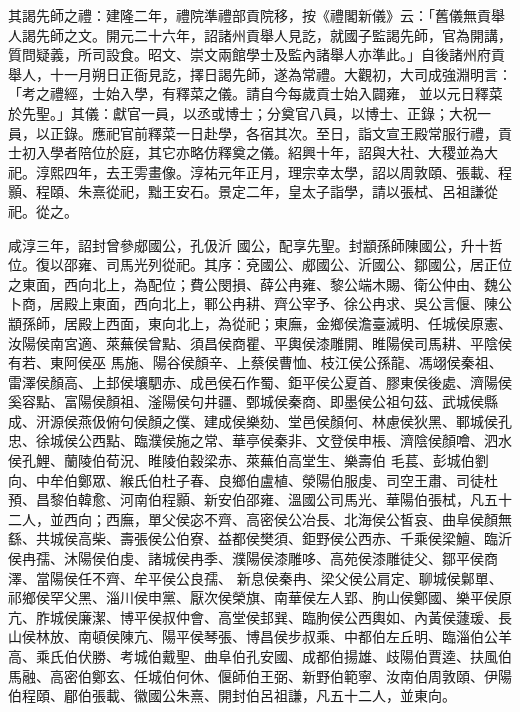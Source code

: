 \begin{pinyinscope}
 其謁先師之禮：建隆二年，禮院準禮部貢院移，按《禮閣新儀》云：「舊儀無貢舉人謁先師之文。開元二十六年，詔諸州貢舉人見訖，就國子監謁先師，官為開講，質問疑義，所司設食。昭文、崇文兩館學士及監內諸舉人亦準此。」自後諸州府貢舉人，十一月朔日正衙見訖，擇日謁先師，遂為常禮。大觀初，大司成強淵明言：「考之禮經，士始入學，有釋菜之儀。請自今每歲貢士始入闢雍，
 並以元日釋菜於先聖。」其儀：獻官一員，以丞或博士；分奠官八員，以博士、正錄；大祝一員，以正錄。應祀官前釋菜一日赴學，各宿其次。至日，詣文宣王殿常服行禮，貢士初入學者陪位於庭，其它亦略仿釋奠之儀。紹興十年，詔與大社、大稷並為大祀。淳熙四年，去王雱畫像。淳祐元年正月，理宗幸太學，詔以周敦頤、張載、程顥、程頤、朱熹從祀，黜王安石。景定二年，皇太子詣學，請以張栻、呂祖謙從祀。從之。



 咸淳三年，詔封曾參郕國公，孔伋沂
 國公，配享先聖。封顓孫師陳國公，升十哲位。復以邵雍、司馬光列從祀。其序：兗國公、郕國公、沂國公、鄒國公，居正位之東面，西向北上，為配位；費公閔損、薛公冉雍、黎公端木賜、衛公仲由、魏公卜商，居殿上東面，西向北上，鄆公冉耕、齊公宰予、徐公冉求、吳公言偃、陳公顓孫師，居殿上西面，東向北上，為從祀；東廡，金鄉侯澹臺滅明、任城侯原憲、汝陽侯南宮適、萊蕪侯曾點、須昌侯商瞿、平輿侯漆雕開、睢陽侯司馬耕、平陰侯有若、東阿侯巫
 馬施、陽谷侯顏辛、上蔡侯曹恤、枝江侯公孫龍、馮翊侯秦祖、雷澤侯顏高、上邽侯壤駟赤、成邑侯石作蜀、鉅平侯公夏首、膠東侯後處、濟陽侯奚容點、富陽侯顏祖、滏陽侯句井疆、鄄城侯秦商、即墨侯公祖句茲、武城侯縣成、汧源侯燕伋俯句侯顏之僕、建成侯樂劾、堂邑侯顏何、林慮侯狄黑、鄆城侯孔忠、徐城侯公西點、臨濮侯施之常、華亭侯秦非、文登侯申棖、濟陰侯顏噲、泗水侯孔鯉、蘭陵伯荀況、睢陵伯穀梁赤、萊蕪伯高堂生、樂壽伯
 毛萇、彭城伯劉向、中牟伯鄭眾、緱氏伯杜子春、良鄉伯盧植、滎陽伯服虔、司空王肅、司徒杜預、昌黎伯韓愈、河南伯程顥、新安伯邵雍、溫國公司馬光、華陽伯張栻，凡五十二人，並西向；西廡，單父侯宓不齊、高密侯公冶長、北海侯公皙哀、曲阜侯顏無繇、共城侯高柴、壽張侯公伯寮、益都侯樊須、鉅野侯公西赤、千乘侯梁鱣、臨沂侯冉孺、沐陽侯伯虔、諸城侯冉季、濮陽侯漆雕哆、高苑侯漆雕徒父、鄒平侯商澤、當陽侯任不齊、牟平侯公良孺、
 新息侯秦冉、梁父侯公肩定、聊城侯鄡單、祁鄉侯罕父黑、淄川侯申黨、厭次侯榮旗、南華侯左人郢、朐山侯鄭國、樂平侯原亢、胙城侯廉潔、博平侯叔仲會、高堂侯邽巽、臨朐侯公西輿如、內黃侯蘧瑗、長山侯林放、南頓侯陳亢、陽平侯琴張、博昌侯步叔乘、中都伯左丘明、臨淄伯公羊高、乘氏伯伏勝、考城伯戴聖、曲阜伯孔安國、成都伯揚雄、歧陽伯賈逵、扶風伯馬融、高密伯鄭玄、任城伯何休、偃師伯王弼、新野伯範寧、汝南伯周敦頤、伊陽
 伯程頤、郿伯張載、徽國公朱熹、開封伯呂祖謙，凡五十二人，並東向。




\end{pinyinscope}
